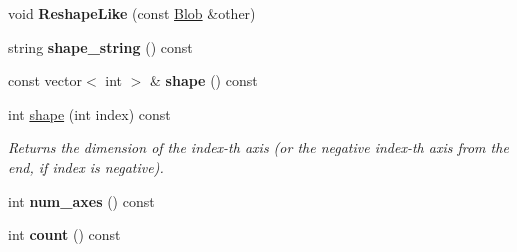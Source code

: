 \begin{DoxyCompactItemize}
\item 
void {\bfseries Reshape\+Like} (const \hyperlink{classcaffe_1_1Blob}{Blob} \&other)\hypertarget{classcaffe_1_1Blob_aa8dee739aaa4253f73c44904784ce417}{}\label{classcaffe_1_1Blob_aa8dee739aaa4253f73c44904784ce417}

\item 
string {\bfseries shape\+\_\+string} () const \hypertarget{classcaffe_1_1Blob_a300cd4f89222d01ec5d9826625a0227e}{}\label{classcaffe_1_1Blob_a300cd4f89222d01ec5d9826625a0227e}

\item 
const vector$<$ int $>$ \& {\bfseries shape} () const \hypertarget{classcaffe_1_1Blob_aec8d4b4a44cc0783e9c8333c38226f8f}{}\label{classcaffe_1_1Blob_aec8d4b4a44cc0783e9c8333c38226f8f}

\item 
int \hyperlink{classcaffe_1_1Blob_a3aab16f3e07ddc78e29a101d022a34cd}{shape} (int index) const 
\begin{DoxyCompactList}\small\item\em Returns the dimension of the index-\/th axis (or the negative index-\/th axis from the end, if index is negative). \end{DoxyCompactList}\item 
int {\bfseries num\+\_\+axes} () const \hypertarget{classcaffe_1_1Blob_ab0774eb9e8cd070c7af741b56602f74b}{}\label{classcaffe_1_1Blob_ab0774eb9e8cd070c7af741b56602f74b}

\item 
int {\bfseries count} () const \hypertarget{classcaffe_1_1Blob_abf97753a599dd546c16d55ba926d4e81}{}\label{classcaffe_1_1Blob_abf97753a599dd546c16d55ba926d4e81}


\end{DoxyCompactItemize}
